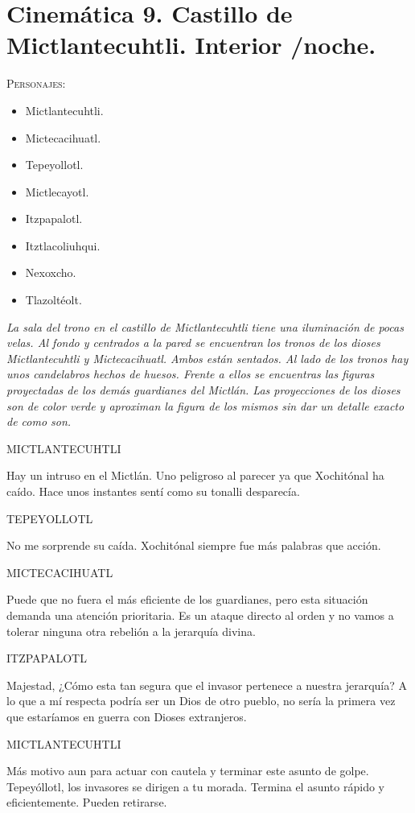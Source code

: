 \documentclass[11pt,letterpaper]{article}
\begin{document}
 
 \section{Cinemática 9. Castillo de Mictlantecuhtli. Interior /noche.}
  \textsc{Personajes}:
  \begin{itemize}
  \item Mictlantecuhtli.
	\item Mictecacihuatl.
	\item Tepeyollotl.
	\item Mictlecayotl.
	\item Itzpapalotl.
	\item Itztlacoliuhqui.
	\item Nexoxcho.
	\item Tlazoltéolt.
  \end{itemize}
  
  \textit{La sala del trono en el castillo de Mictlantecuhtli tiene una iluminación de pocas velas. Al fondo y centrados a la pared se encuentran los tronos de los dioses Mictlantecuhtli y Mictecacihuatl. Ambos están sentados. Al lado de los tronos hay unos candelabros hechos de huesos. Frente a ellos se encuentras las figuras proyectadas de los demás guardianes del Mictlán. Las proyecciones de los dioses son de color verde y aproximan la figura de los mismos sin dar un detalle exacto de como son.}
  
\begin{center}
	MICTLANTECUHTLI
	\\
\par
Hay un intruso en el Mictlán. Uno peligroso al parecer ya que Xochitónal ha caído. Hace unos instantes sentí como su tonalli desparecía.  
\\
\par
TEPEYOLLOTL
\\
\par
No me sorprende su caída. Xochitónal siempre fue más palabras que acción.
\\
\par
MICTECACIHUATL
\\
\par
Puede que no fuera el más eficiente de los guardianes, pero esta situación demanda una atención prioritaria. Es un ataque directo al orden y no vamos a tolerar ninguna otra rebelión a la jerarquía divina.
\\
\par
ITZPAPALOTL
\\
\par
Majestad, ¿Cómo esta tan segura que el invasor pertenece a nuestra jerarquía? A lo que a mí respecta podría ser un Dios de otro pueblo, no sería la primera vez que estaríamos en guerra con Dioses extranjeros.
\\
\par
MICTLANTECUHTLI
\\
\par
Más motivo aun para actuar con cautela y terminar este asunto de golpe. Tepeyóllotl, los invasores se dirigen a tu morada. Termina el asunto rápido y eficientemente. Pueden retirarse.
\end{center}
\end{document}
